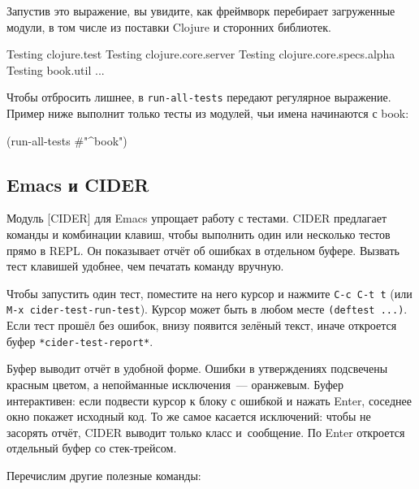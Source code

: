 \fi

Запустив это выражение, вы увидите, как фреймворк перебирает загруженные модули,
в том числе из поставки Clojure и сторонних библиотек.

\begin{english}
  \begin{text}
Testing clojure.test
Testing clojure.core.server
Testing clojure.core.specs.alpha
Testing book.util
...
  \end{text}
\end{english}


Чтобы отбросить лишнее, в \verb|run-all-tests| передают регулярное выражение.
Пример ниже выполнит только тесты из модулей, чьи имена начинаются с book:

\begin{english}
  \begin{clojure}
(run-all-tests #"^book")
  \end{clojure}
\end{english}

\subsection{Emacs и CIDER}


Модуль [CIDER] для
Emacs упрощает работу с тестами. CIDER предлагает команды и комбинации клавиш,
чтобы выполнить один или несколько тестов прямо в REPL. Он показывает отчёт об
ошибках в отдельном буфере. Вызвать тест клавишей удобнее, чем печатать команду
вручную.

Чтобы запустить один тест, поместите на него курсор и нажмите \verb|C-c C-t t|
(или \verb|M-x cider-test-run-test|). Курсор может быть в любом месте
\verb|(deftest ...)|. Если тест прошёл без ошибок, внизу появится зелёный
текст, иначе откроется буфер \verb|*cider-test-report*|.

Буфер выводит отчёт в удобной форме. Ошибки в утверждениях подсвечены красным
цветом, а непойманные исключения~--- оранжевым. Буфер интерактивен: если
подвести курсор к блоку с ошибкой и нажать Enter, соседнее окно покажет исходный
код. То же самое касается исключений: чтобы не засорять отчёт, CIDER выводит
только класс и~сообщение. По Enter откроется отдельный буфер со стек-трейсом.

Перечислим другие полезные команды:

